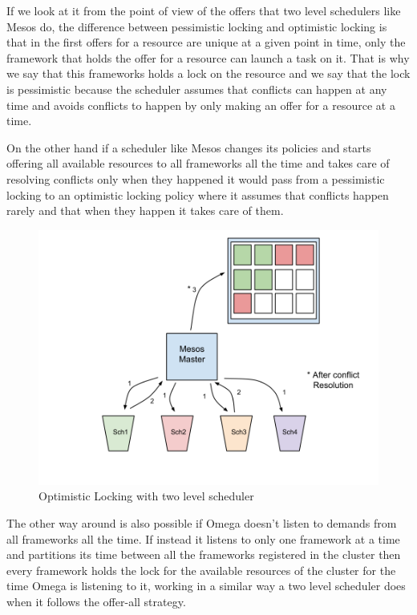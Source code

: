 \documentclass{svjour3}                     %
\begin{document}
If we look at it from the point of view of the offers that two level
schedulers like Mesos do, the difference between pessimistic locking
and optimistic locking is that in the first offers for a resource are
unique at a given point in time, only the framework that holds the
offer for a resource can launch a task on it. That is why we say that
this frameworks holds a lock on the resource and we say that the lock
is pessimistic because the scheduler assumes that conflicts can happen
at any time and avoids conflicts to happen by only making an offer for
a resource at a time.

On the other hand if a scheduler like Mesos changes its policies and
starts offering all available resources to all frameworks all the time
and takes care of resolving conflicts only when they happened it would
pass from a pessimistic locking to an optimistic locking policy where
it assumes that conflicts happen rarely and that when they happen it
takes care of them.

\begin{figure}[!ht]
  \centering
  \includegraphics[scale=0.25,natwidth=960,natheight=720]{MesosOptimisticLocking.png}
  \caption{Optimistic Locking with two level scheduler}
  \label{fig:centralized}
\end{figure}

The other way around is also possible if Omega doesn't listen to
demands from all frameworks all the time. If instead it listens to only
one framework at a time and partitions its time between all the
frameworks registered in the cluster then every framework holds the
lock for the available resources of the cluster for the time Omega is
listening to it, working in a similar way a two level scheduler does
when it follows the offer-all strategy.
\end{document}
